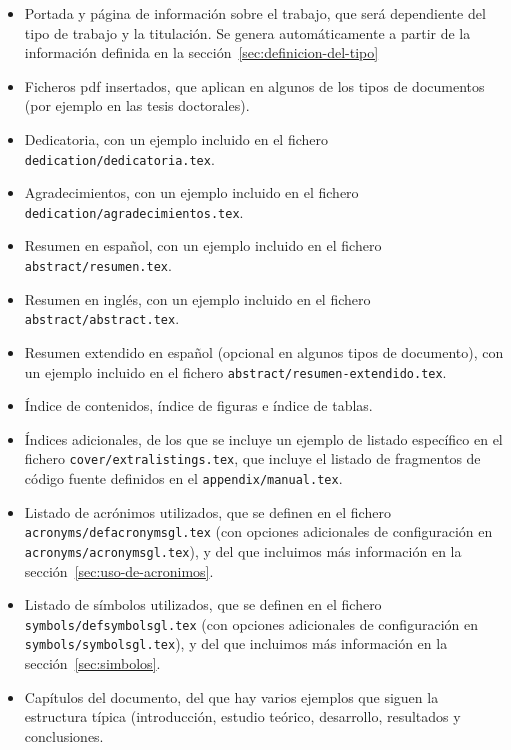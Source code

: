 \documentclass[spanish,openright]{book}
\begin{document}
\begin{itemize}

\item Portada y página de información sobre el trabajo, que será
  dependiente del tipo de trabajo y la titulación. Se genera
  automáticamente a partir de la información definida en la
  sección~\ref{sec:definicion-del-tipo}

\item Ficheros pdf insertados, que aplican en algunos de los tipos de
  documentos (por ejemplo en las tesis doctorales).

\item Dedicatoria, con un ejemplo incluido en el fichero
  \texttt{dedication/dedicatoria.tex}.
\item Agradecimientos, con un ejemplo incluido en el fichero
  \texttt{dedication/agradecimientos.tex}.


\item Resumen en español, con un ejemplo incluido en el fichero
  \texttt{abstract/resumen.tex}.
\item Resumen en inglés, con un ejemplo incluido en el fichero
  \texttt{abstract/abstract.tex}.
\item Resumen extendido en español (opcional en algunos tipos de
  documento), con un ejemplo incluido en el fichero
  \texttt{abstract/resumen-extendido.tex}.

\item Índice de contenidos, índice de figuras e índice de tablas.
\item Índices adicionales, de los que se incluye un ejemplo de listado
  específico en el fichero \texttt{cover/extralistings.tex}, que incluye
  el listado de fragmentos de código fuente definidos en el
  \texttt{appendix/manual.tex}.

\item Listado de acrónimos utilizados, que se definen en el fichero
  \texttt{acronyms/defacronymsgl.tex} (con opciones adicionales de
  configuración en \texttt{acronyms/acronymsgl.tex}), y del que
  incluimos más información en la sección~\ref{sec:uso-de-acronimos}.
\item Listado de símbolos utilizados, que se definen en el fichero
  \texttt{symbols/defsymbolsgl.tex} (con opciones adicionales de
  configuración en \texttt{symbols/symbolsgl.tex}), y del que incluimos
  más información en la sección~\ref{sec:simbolos}.


\item Capítulos del documento, del que hay varios ejemplos que siguen la
  estructura típica (introducción, estudio teórico, desarrollo,
  resultados y conclusiones.


\end{itemize}
\end{document}

